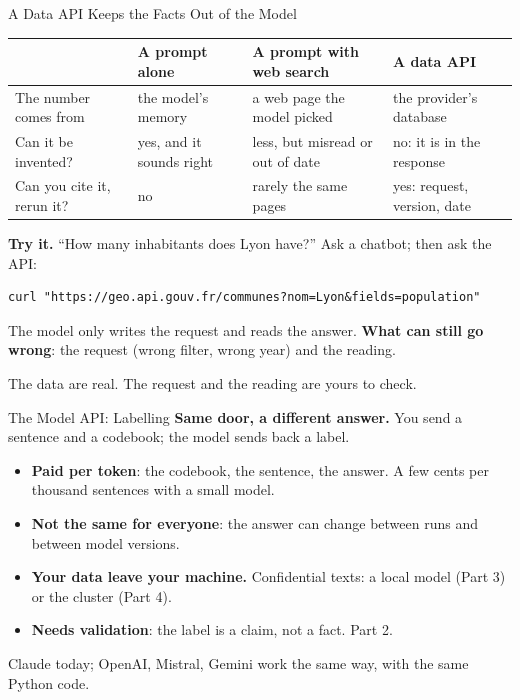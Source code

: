 \documentclass[svgnames,x11names,dvipsnames]{beamer}
\newcommand{\chg}[1]{{\bfseries #1}}
\renewcommand{\chg}[1]{#1}
\begin{document}
\begin{frame}[fragile]{\chg{A Data API Keeps the Facts Out of the Model}}
\footnotesize
\renewcommand{\arraystretch}{1.4}
\setlength{\tabcolsep}{4pt}
\begin{tabular}{@{}>{\raggedright\arraybackslash}p{2.3cm}>{\raggedright\arraybackslash}p{2.4cm}>{\raggedright\arraybackslash}p{2.6cm}>{\raggedright\arraybackslash}p{2.6cm}@{}}
\toprule
& \textbf{A prompt alone} & \textbf{A prompt with web search} & \textbf{A data API} \\
\midrule
The number comes from & the model's memory & a web page the model picked & the provider's database \\
Can it be invented? & yes, and it sounds right & less, but misread or out of date & no: it is in the response \\
Can you cite it, rerun it? & no & rarely the same pages & yes: request, version, date \\
\bottomrule
\end{tabular}

\vspace{0.3cm}
\textbf{Try it.} ``How many inhabitants does Lyon have?'' Ask a chatbot; then ask the API:

\vspace{0.1cm}
{\scriptsize
\begin{verbatim}
curl "https://geo.api.gouv.fr/communes?nom=Lyon&fields=population"
\end{verbatim}}

\vspace{0.1cm}
The model only writes the request and reads the answer. \textbf{What can still go wrong}: the request (wrong filter, wrong year) and the reading.

\vspace{0.2cm}
{\centering \alert{The data are real. The request and the reading are yours to check.}\par}
\end{frame}

\begin{frame}{The Model API: Labelling}
\small
\textbf{Same door, a different answer.} You send a sentence and a codebook; the model sends back a label.

\vspace{0.4cm}
\begin{itemize}
    \setlength{\itemsep}{5pt}
    \item \textbf{Paid per token}: the codebook, the sentence, the answer. A few cents per thousand sentences with a small model.
    \item \textbf{Not the same for everyone}: the answer can change between runs and between model versions.
    \item \textbf{Your data leave your machine.} Confidential texts: a local model (Part 3) or the cluster (Part 4).
    \item \textbf{Needs validation}: the label is a claim, not a fact. Part 2.
\end{itemize}

\vspace{0.4cm}
Claude today; OpenAI, Mistral, Gemini work the same way, with the same Python code.
\end{frame}
\end{document}

